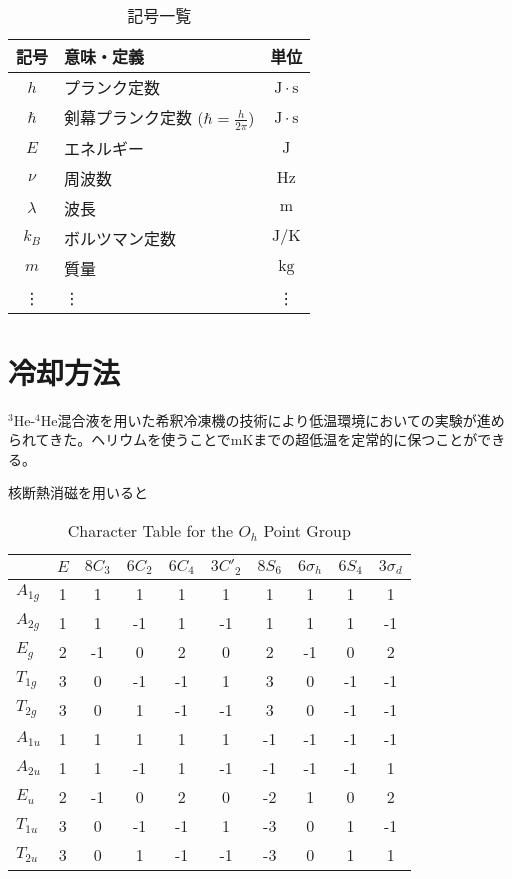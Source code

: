 \documentclass[platex,dvipdfmx]{jlreq}			%
\begin{document}
\begin{table}[h]
    \centering
    \begin{tabular}{|c|m{8cm}|c|}
        \hline
        記号 & 意味・定義 & 単位 \\ \hline
        \( h \) & プランク定数 & \( \mathrm{J \cdot s} \) \\ \hline
        \( \hbar \) & 剣幕プランク定数 (\( \hbar = \frac{h}{2\pi} \)) & \( \mathrm{J \cdot s} \) \\ \hline
        \( E \) & エネルギー & \( \mathrm{J} \) \\ \hline
        \( \nu \) & 周波数 & \( \mathrm{Hz} \) \\ \hline
        \( \lambda \) & 波長 & \( \mathrm{m} \) \\ \hline
        \( k_B \) & ボルツマン定数 & \( \mathrm{J/K} \) \\ \hline
        \( m \) & 質量 & \( \mathrm{kg} \) \\ \hline
        \vdots & \vdots & \vdots \\ \hline
    \end{tabular}
    \caption{記号一覧}
    \label{tab:symbol_list}
\end{table}
\newpage







\appendix
\section{冷却方法}
$^3$He-$^4$He混合液を用いた希釈冷凍機の技術により低温環境においての実験が進められてきた。ヘリウムを使うことで$\text{mK}$までの超低温を定常的に保つことができる。

核断熱消磁を用いると
\begin{table}[htbp]
\centering
\begin{tabular}{l|ccccccccc}
\toprule
& \( E \) & \( 8C_3 \) & \( 6C_2 \) & \( 6C_4 \) & \( 3C'_2 \) & \( 8S_6 \) & \( 6\sigma_h \) & \( 6S_4 \) & \( 3\sigma_d \) \\
\midrule
\( A_{1g} \) & 1 & 1 & 1 & 1 & 1 & 1 & 1 & 1 & 1 \\
\( A_{2g} \) & 1 & 1 & -1 & 1 & -1 & 1 & 1 & 1 & -1 \\
\( E_g \) & 2 & -1 & 0 & 2 & 0 & 2 & -1 & 0 & 2 \\
\( T_{1g} \) & 3 & 0 & -1 & -1 & 1 & 3 & 0 & -1 & -1 \\
\( T_{2g} \) & 3 & 0 & 1 & -1 & -1 & 3 & 0 & -1 & -1 \\
\( A_{1u} \) & 1 & 1 & 1 & 1 & 1 & -1 & -1 & -1 & -1 \\
\( A_{2u} \) & 1 & 1 & -1 & 1 & -1 & -1 & -1 & -1 & 1 \\
\( E_u \) & 2 & -1 & 0 & 2 & 0 & -2 & 1 & 0 & 2 \\
\( T_{1u} \) & 3 & 0 & -1 & -1 & 1 & -3 & 0 & 1 & -1 \\
\( T_{2u} \) & 3 & 0 & 1 & -1 & -1 & -3 & 0 & 1 & 1 \\
\bottomrule
\end{tabular}
\caption{Character Table for the \( O_h \) Point Group}
\label{tab:Oh}
\end{table}
\end{document}
